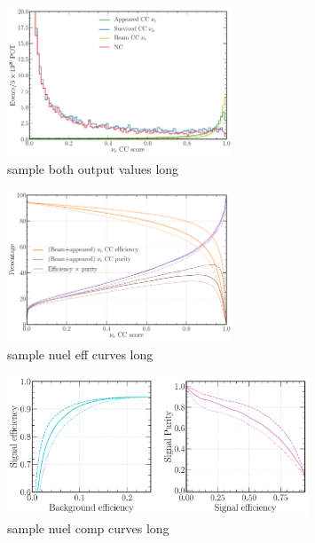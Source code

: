 \begin{figure} %
    \includegraphics[width=0.6\textwidth]{diagrams/7-cvn/chipsnet/sample_both_output_values.pdf}
    \caption[sample both output values short]
    {sample both output values long}
    \label{fig:sample_both_output_values}
\end{figure}

\begin{figure} %
    \includegraphics[width=0.6\textwidth]{diagrams/7-cvn/chipsnet/sample_nuel_eff_curves.pdf}
    \caption[sample nuel eff curves short]
    {sample nuel eff curves long}
    \label{fig:sample_nuel_eff_curves}
\end{figure}

\begin{figure} %
    \includegraphics[width=0.8\textwidth]{diagrams/7-cvn/chipsnet/sample_nuel_comp_curves.pdf}
    \caption[sample nuel comp curves short]
    {sample nuel comp curves long}
    \label{fig:sample_nuel_comp_curves}
\end{figure}

